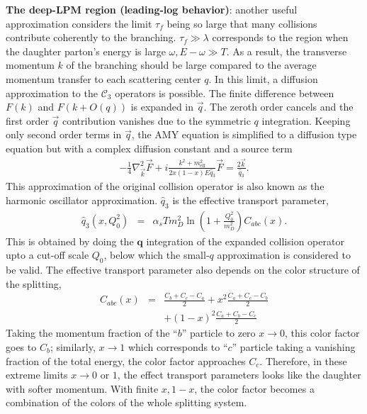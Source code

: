 {\bf The deep-LPM region (leading-log behavior)}: another useful approximation considers the limit $\tau_f$ being so large that many collisions contribute coherently to the branching. 
$\tau_f \gg \lambda$ corresponds to the region when the daughter parton's energy is large $\omega, E-\omega \gg T$.
As a result, the transverse momentum $k$ of the branching should be large compared to the average momentum transfer to each scattering center $q$.
In this limit, a diffusion approximation to the $\mathcal{C}_3$ operators is possible.
The finite difference between $F(k)$ and $F(k+O(q))$ is expanded in $\vec{q}$. 
The zeroth order cancels and the first order $\vec{q}$ contribution  vanishes due to the symmetric $q$ integration.
Keeping only second order terms in $\vec{q}$, the AMY equation is simplified to a diffusion type equation but with a complex diffusion constant and a source term \cite{Arnold:2008zu}
\begin{eqnarray}
- \frac{1}{4} \nabla^2_{\vec{k}}\vec{F} + i\frac{k^2 + m^2_{\textrm{eff}}}{2x(1-x)E\hat{q}_3}\vec{F} = \frac{2\vec{k}}{\hat{q}_3}.
\end{eqnarray}
This approximation of the original collision operator is also known as the harmonic oscillator approximation.
$\hat{q}_3$ is the effective transport parameter,
\begin{eqnarray}
\hat{q}_3(x, Q_0^2) &=& \alpha_s T m_D^2 \ln\left(1+\frac{Q_0^2}{m_D^2}\right) C_{abc}(x).\label{eq:qhat3}
\end{eqnarray}
This is obtained by doing the $\mathbf{q}$ integration of the expanded collision operator upto a cut-off scale $Q_0$, below which the small-$q$ approximation is considered to be valid.
The effective transport parameter also depends on the color structure of the splitting,
\begin{eqnarray}
C_{abc}(x) &=&  \frac{C_b+C_c-C_a}{2} + x^2 \frac{C_a+C_c-C_b}{2} \\
&&+(1-x)^2\frac{C_a+C_b-C_c}{2}
\end{eqnarray}
Taking the momentum fraction of the ``$b$'' particle to zero $x\rightarrow 0$, this color factor goes to $C_b$; similarly, $x\rightarrow 1$ which corresponds to ``$c$'' particle taking a vanishing fraction of the total energy, the color factor approaches $C_c$.
Therefore, in these extreme limits $x\rightarrow 0$ or $1$, the effect transport parameters looks like the daughter with softer momentum.
With finite $x, 1-x$, the color factor becomes a combination of the colors of the whole splitting system.

